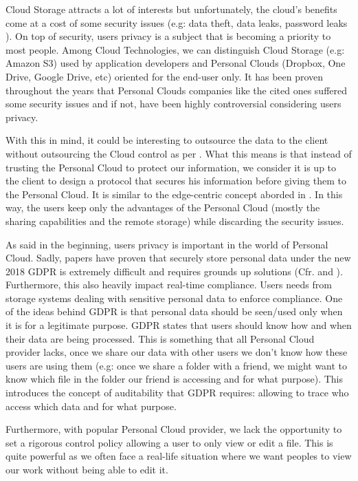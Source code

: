 \documentclass[../main.tex]{subfiles}
\begin{document}
\par Cloud Storage attracts a lot of interests but unfortunately, the cloud's benefits come at a cost of some security issues (e.g: data theft, data leaks, password leaks \cite{wiki:dropboxcritisism}). On top of security, users privacy is a subject that is becoming a priority to most people. Among Cloud Technologies, we can distinguish Cloud Storage (e.g: Amazon S3) used by application developers and Personal Clouds (Dropbox, One Drive, Google Drive, etc) oriented for the end-user only. It has been proven throughout the years that Personal Clouds companies like the cited ones suffered some security issues and if not, have been highly controversial considering users privacy.
\par With this in mind, it could be interesting to outsource the data to the client without outsourcing the Cloud control as per \cite{10.1145/1655008.1655020}. What this means is that instead of trusting the Personal Cloud to protect our information, we consider it is up to the client to design a protocol that secures his information before giving them to the Personal Cloud. It is similar to the edge-centric concept aborded in \cite{10.1145/2831347.2831354}. In this way, the users keep only the advantages of the Personal Cloud (mostly the sharing capabilities and the remote storage) while discarding the security issues.
\par As said in the beginning, users privacy is important in the world of Personal Cloud. Sadly, papers have proven that securely store personal data under the new 2018 GDPR is extremely difficult and requires grounds up solutions (Cfr. \cite{234843} and \cite{234729}). Furthermore, this also heavily impact real-time compliance. Users needs from storage systems dealing with sensitive personal data to enforce compliance. One of the ideas behind GDPR is that personal data should be seen/used only when it is for a legitimate purpose. GDPR states that users should know how and when their data are being processed. This is something that all Personal Cloud provider lacks, once we share our data with other users we don't know how these users are using them (e.g: once we share a folder with a friend, we might want to know which file in the folder our friend is accessing and for what purpose).  This introduces the concept of auditability that GDPR requires: allowing to trace who access which data and for what purpose.
\par Furthermore, with popular Personal Cloud provider, we lack the opportunity to set a rigorous control policy allowing a user to only view or edit a file. This is quite powerful as we often face a real-life situation where we want peoples to view our work without being able to edit it.
\end{document}

